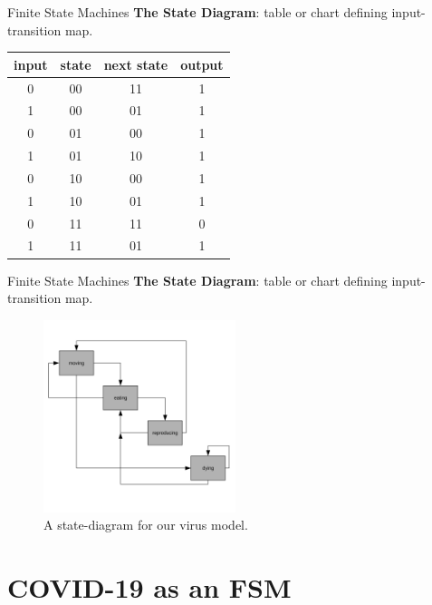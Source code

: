 \documentclass{beamer}
\begin{document}
\begin{frame}{Finite State Machines}
\textbf{The State Diagram}: table or chart defining input-transition map.
\begin{table}
\centering
\begin{tabular}{| c | c | c | c |}
\hline
input & state & next state & output \\ \hline \hline
0 & 00 & 11 & 1 \\ \hline
1 & 00 & 01 & 1 \\ \hline
0 & 01 & 00 & 1 \\ \hline
1 & 01 & 10 & 1 \\ \hline
0 & 10 & 00 & 1 \\ \hline
1 & 10 & 01 & 1 \\ \hline
0 & 11 & 11 & 0 \\ \hline
1 & 11 & 01 & 1 \\ \hline
\end{tabular}
\end{table}
\end{frame}

\begin{frame}{Finite State Machines}
\textbf{The State Diagram}: table or chart defining input-transition map.
\begin{figure}
\centering
\includegraphics[width=0.5\textwidth]{figures/state_diagram.pdf}
\caption{\label{fig:state1} A state-diagram for our virus model.}
\end{figure}
\end{frame}

\section{COVID-19 as an FSM}
\end{document}
